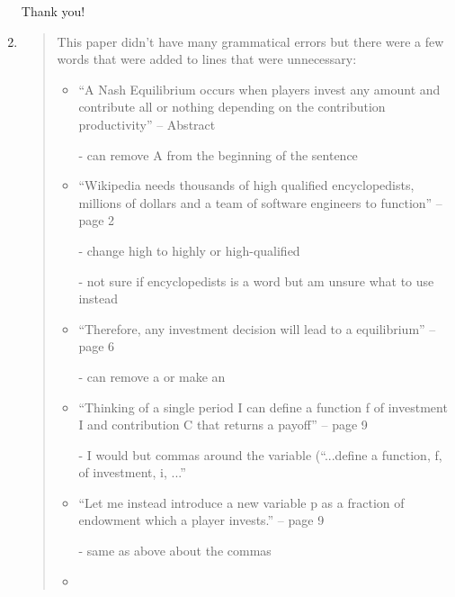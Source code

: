 \documentclass{article}
\newenvironment{itquote}
	{\begin{quote}\itshape}
	{\end{quote}\ignorespacesafterend}
\begin{document}
\begin{enumerate}
\begin{itquote}
				\end{itquote}

				Thank you!

			\item

				\begin{itquote}

					This paper didn't have many grammatical errors but there were a few words that were added to lines that were unnecessary:

					\begin{itemize}
						\item 

							“A Nash Equilibrium occurs when players invest any amount and contribute all or nothing depending on the contribution productivity” – Abstract

							- can remove A from the beginning of the sentence

						\item

							“Wikipedia needs thousands of high qualified encyclopedists, millions of dollars and a team of software engineers to function” – page 2
							
							- change high to highly or high-qualified
	
							- not sure if encyclopedists is a word but am unsure what to use instead

						\item
							
							“Therefore, any investment decision will lead to a equilibrium” – page 6
							
							- can remove a or make an

						\item
						
							“Thinking of a single period I can define a function f of investment I and contribution C that returns a payoff” – page 9
							
							- I would but commas around the variable (“...define a function, f, of investment, i, ...”

						\item
							
							“Let me instead introduce a new variable p as a fraction of endowment which a player invests.” – page 9
						
							- same as above about the commas

						\item


\end{itemize}
\end{itquote}
\end{enumerate}
\end{document}
